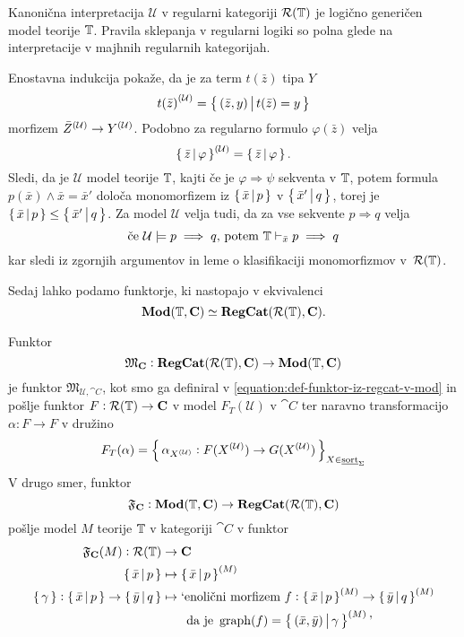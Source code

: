 \documentclass[../kategoricna_logika.tex]{subfiles}
\begin{document}
\begin{izrek}\label{izrek:logicno-genericen-model-regularne-logike}
  Kanonična interpretacija $\mathcal{U}$ v regularni kategoriji
  $\mathcal{R}(\mathbb{T})$ je logično generičen model teorije $\mathbb{T}$. Pravila
  sklepanja v regularni logiki so polna glede na interpretacije v
  majhnih regularnih kategorijah.
\end{izrek}
\begin{dokaz}
Enostavna indukcija pokaže, da je za term $t(\bar{z})$ tipa $Y$
$${t(\bar{z})}^{(\mathcal{U})} = \left\lbrace\,(\bar{z},y)\,\middle|\, t(\bar{z}) = y\,\right\rbrace$$
morfizem ${\bar{Z}}^{(\mathcal{U})} \to {Y}^{(\mathcal{U})}$. Podobno za regularno
formulo $\varphi(\bar{z})$ velja
$${\left\lbrace\,\bar{z}\,\middle|\, \varphi\,\right\rbrace}^{(\mathcal{U})} = \left\lbrace\,\bar{z}\,\middle|\, \varphi\,\right\rbrace.$$
Sledi, da je $\mathcal{U}$ model teorije $\mathbb{T}$, kajti če je
$\varphi \Rightarrow \psi$ sekventa v $\mathbb{T}$, potem formula
$p(\bar{x}) \wedge \bar{x}= \bar{x}'$ določa monomorfizem iz
$\left\lbrace\,\bar{x}\,\middle|\, p\,\right\rbrace$ v $\left\lbrace\,\bar{x}'\,\middle|\, q\,\right\rbrace$, torej
je $\left\lbrace\,\bar{x}\,\middle|\, p\,\right\rbrace \leq \left\lbrace\,\bar{x}'\,\middle|\, q\,\right\rbrace$.
Za model $\mathcal{U}$ velja tudi, da za vse sekvente
$p \Rightarrow q$ velja
$$\text{če} \ \mathcal{U} \models p \implies q \text{, potem} \ \mathbb{T} \vdash_{\bar{x}} p \implies q$$
kar sledi iz zgornjih argumentov in leme o klasifikaciji monomorfizmov
v~$\mathcal{R}(\mathbb{T})$.
\end{dokaz}
Sedaj lahko podamo funktorje, ki nastopajo v ekvivalenci
$$\mathbf{Mod}(\mathbb{T}, {\operatorname{\mathbf{C}}}) \simeq {\operatorname{\mathbf{RegCat}}}(\mathcal{R}(\mathbb{T}), {\operatorname{\mathbf{C}}}).$$
\begin{definicija}\label{def:ekvivalenca-reg-logike-reg-kategorij}
Funktor
$$\mathfrak{M}_{{\operatorname{\mathbf{C}}}} : {\operatorname{\mathbf{RegCat}}}(\mathcal{R}(\mathbb{T}), {\operatorname{\mathbf{C}}}) \to \mathbf{Mod}(\mathbb{T}, {\operatorname{\mathbf{C}}})$$
je funktor $\mathfrak{M}_{\mathcal{U}, \cat{C}}$, kot smo ga definiral
v \eqref{equation:def-funktor-iz-regcat-v-mod} in pošlje funktor
$F : \mathcal{R}(\mathbb{T}) \to {\operatorname{\mathbf{C}}}$ v model $F_T(\mathcal{U})$ v
$\cat{C}$ ter naravno transformacijo $\alpha : F \to F$ v družino
$$F_T(\alpha) = \left\lbrace\,\alpha_{{X}^{(\mathcal{U})}} : F({X}^{(\mathcal{U})}) \to G({X}^{(\mathcal{U})})\,\right\rbrace_{X \in \underline{\mathrm{sort}}_{\Sigma}}$$
V drugo smer, funktor
$$\mathfrak{F}_{{\operatorname{\mathbf{C}}}} : \mathbf{Mod}(\mathbb{T}, {\operatorname{\mathbf{C}}}) \to {\operatorname{\mathbf{RegCat}}}(\mathcal{R}(\mathbb{T}), {\operatorname{\mathbf{C}}})$$
pošlje model $M$ teorije $\mathbb{T}$ v kategoriji $\cat{C}$ v funktor
\begin{align*}
  \mathfrak{F}_{\cat{C}}(M) : \mathcal{R}(\T) &\to \cat{C}\\
  \set{\bar{x}\,\middle|\, p} &\mapsto \set{\bar{x}\,\middle|\, p}^{(M)} \\
  \set{\gamma} : \set{\bar{x}\,\middle|\, p} \to \set{\bar{y}\,\middle|\, q} &\mapsto \text{`enolični morfizem} \ f : \set{\bar{x}\,\middle|\, p}^{(M)} \to \set{\bar{y}\,\middle|\, q}^{(M)} \\ 
                                           &\qquad \text{da je} \ \graf(f) = \set{(\bar{x}, \bar{y}) \,\middle|\, \gamma}^{(M)} \text{'}
\end{align*}
\end{definicija}
\end{document}
